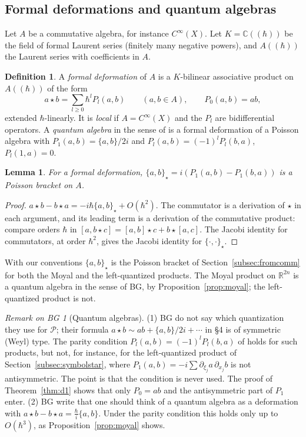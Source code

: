 \documentclass[11pt,oneside,reqno]{article}
\newcommand{\C}{\mathbb C}
\newcommand{\R}{\mathbb R}
\newcommand{\cP}{\mathcal P}
\newcommand{\CI}{C^\infty}
\newcommand{\hb}{\hbar}
\newcommand{\Lser}[1]{(\!(#1)\!)}
\newcommand{\pa}{\partial}
\theoremstyle{plain}
\newtheorem{lemma}[theorem]{Lemma}
\theoremstyle{definition}
\newtheorem{definition}[theorem]{Definition}
\theoremstyle{remark}
\newtheorem{bgremark}[theorem]{Remark on BG}
\begin{document}
\subsection{Formal deformations and quantum algebras}\label{subsec:quantum}
Let \(A\) be a commutative algebra, for instance \(\CI(X)\). Let
\(K=\C\Lser{\hb}\) be the field of formal Laurent series (finitely many negative
powers), and \(A\Lser{\hb}\) the Laurent series with coefficients in \(A\).

\begin{definition}\label{def:deformation}
A \emph{formal deformation} of \(A\) is a \(K\)-bilinear associative product on
\(A\Lser{\hb}\) of the form
\[
 a\star b=\sum_{l\ge0}\hb^lP_l(a,b)\qquad(a,b\in A),\qquad P_0(a,b)=ab ,
\]
extended \(\hb\)-linearly. It is \emph{local} if \(A=\CI(X)\) and the \(P_l\) are
bidifferential operators. A \emph{quantum algebra} in the sense of
\cite[\S1]{BG} is a formal deformation of a Poisson algebra with
\(P_1(a,b)=\{a,b\}/2i\) and \(P_l(a,b)=(-1)^lP_l(b,a)\), \(P_l(1,a)=0\).
\end{definition}

\begin{lemma}\label{lem:deformpoisson}
For a formal deformation, \(\{a,b\}_\star=i(P_1(a,b)-P_1(b,a))\) is a Poisson bracket
on \(A\).
\end{lemma}

\begin{proof}
\(a\star b-b\star a=-i\hb\{a,b\}_\star+O(\hb^2)\). The commutator is a derivation
of \(\star\) in each argument, and its leading term is a derivation of the
commutative product: compare orders \(\hb\) in \([a,b\star c]=[a,b]\star
c+b\star[a,c]\). The Jacobi identity for commutators, at order \(\hb^2\), gives
the Jacobi identity for \(\{\cdot,\cdot\}_\star\).
\end{proof}

With our conventions \(\{a,b\}_\star\) is the Poisson bracket of
Section~\ref{subsec:fromcomm} for both the Moyal and the left-quantized
products. The Moyal product on \(\R^{2n}\) is a quantum algebra in the sense
of BG, by Proposition~\ref{prop:moyal}; the left-quantized product is not.

\begin{bgremark}[Quantum algebras]\label{rem:parity}
(1) BG do not say which quantization they use for \(\cP\); their formula
\(a\star b\sim ab+\{a,b\}/2i+\cdots\) in \S4 is of symmetric (Weyl) type. The parity
condition \(P_l(a,b)=(-1)^lP_l(b,a)\) of \cite[\S1]{BG} holds for such products, but not,
for instance, for the left-quantized product of Section~\ref{subsec:symbolstar},
where \(P_1(a,b)=-i\sum\pa_{\xi_j}a\,\pa_{x_j}b\) is not antisymmetric. The point is that
the condition is never used. The proof of Theorem~\ref{thm:d1} shows that only
\(P_0=ab\) and the antisymmetric part of \(P_1\) enter. (2) BG write that one
should think of a quantum algebra as a deformation with
\(a\star b-b\star a=\frac\hb i\{a,b\}\). Under the parity condition this holds
only up to \(O(\hb^3)\), as Proposition~\ref{prop:moyal} shows.
\end{bgremark}
\end{document}
